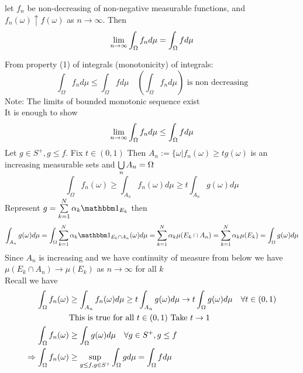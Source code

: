 \begin{thm}\label{MCT} let $f_n$ be non-decreasing of non-negative measurable functions, and $f_n(\omega)\uparrow f(\omega)$ as $n \rightarrow \infty$. Then 
\begin{equation*}
    \lim\limits_{n\rightarrow \infty} \int_\Omega f_n d\mu = \int_\Omega f d\mu
\end{equation*}
\end{thm}
\pf From property (1) of integrals (monotonicity) of integrals:
\begin{equation*}
    \int_\Omega f_n d\mu \leq \int_\Omega f d\mu \quad \left( \int_\Omega f_nd\mu \right) \text{ is non decreasing}
\end{equation*}
Note: The limits of bounded monotonic sequence exist \\
It is enough to show
\begin{equation*}
    \lim\limits_{n\rightarrow \infty} \int_\Omega f_n d\mu \leq \int_\Omega f d\mu
\end{equation*}Let $g \in S^+, g\leq f$. Fix $t\in (0,1)$ Then $A_n:= \{\omega | f_n(\omega) \geq tg(\omega)$ is an increasing measurable sets and $\bigcup\limits_{n}A_n = \Omega$
\begin{equation*}
    \int_{\Omega} f_n(\omega) \geq \int_{A_n} f_n(\omega) d\mu \geq t \int_{A_n} g(\omega) d\mu
\end{equation*}Represent $g = \bigs{k=1}^{N} \alpha_k \I_{E_k}$ then 
\begin{equation*}
    \int_{A_n} g(\omega) d\mu = \int_{\Omega} \bigs{k=1}^{N} \alpha_k \I_{E_k \cap A_n}(\omega) d\mu =  \bigs{k=1}^{N} \alpha_k \mu(E_k \cap A_n) = \bigs{k=1}^{N} \alpha_k \mu(E_k) = \int_{\Omega} g(\omega) d\mu
\end{equation*}Since $A_n$ is increasing and we have continuity of measure from below we have $\mu(E_k \cap A_n) \rightarrow \mu(E_k)$ as $n \rightarrow \infty$ for all $k$ \\
Recall we have
\begin{align*}
    \int_{\Omega} f_n(\omega) &\geq \int_{A_n} f_n(\omega) d\mu \geq t \int_{A_n} g(\omega) d\mu \rightarrow t \int_{\Omega} g(\omega) d\mu \quad \forall t \in (0,1) \\
    &\text{This is true for all $t\in(0,1)$ Take $t \rightarrow 1$} \\
    \int_{\Omega} f_n(\omega) &\geq \int_{\Omega} g(\omega) d\mu \quad \forall g \in S^+, g \leq f \\
    \Rightarrow \int_{\Omega} f_n(\omega) &\geq \sup\limits_{g\leq f, g\in S^+} \int_{\Omega} gd\mu = \int_{\Omega} fd\mu
\end{align*}
